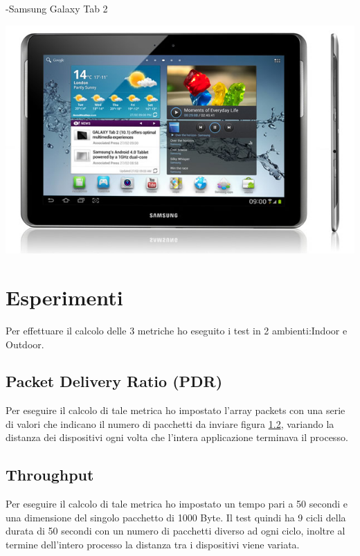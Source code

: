 -Samsung Galaxy Tab 2

\begin{center}
\includegraphics[width=1\textwidth]{imgs/galaxy_tab_2.jpg}
\label{galaxy_tab_2_img}%
\end{center}

\section{Esperimenti}
Per effettuare il calcolo delle 3 metriche ho eseguito i test in 2 ambienti:Indoor e Outdoor.

\subsection{Packet Delivery Ratio (PDR)}





Per eseguire il calcolo di tale metrica ho impostato l'array packets con una serie di valori che indicano il numero di pacchetti da inviare figura \ref{}, variando la distanza dei dispositivi ogni volta che l'intera applicazione terminava il processo.

\subsection{Throughput}





Per eseguire il calcolo di tale metrica ho impostato un tempo pari a 50 secondi e una dimensione del singolo pacchetto di 1000 Byte.
Il test quindi ha 9 cicli della durata di 50 secondi con un numero di pacchetti diverso ad ogni ciclo, inoltre al termine dell'intero processo la distanza tra i dispositivi viene variata.

